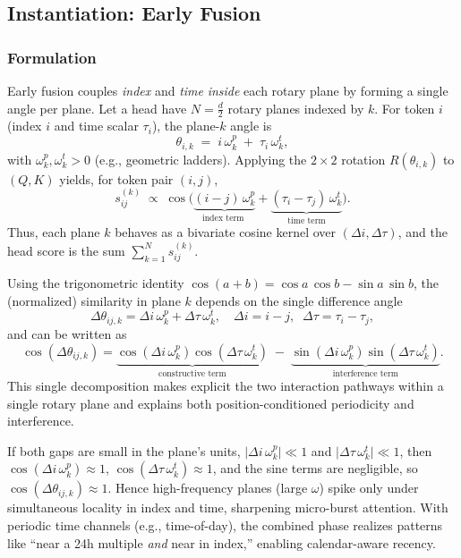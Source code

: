 \documentclass[sigconf]{acmart}
\begin{document}
\subsection{Instantiation: Early Fusion}
\subsubsection{Formulation}
Early fusion couples \emph{index} and \emph{time} \emph{inside} each rotary plane by forming a single angle per plane. 
Let a head have $N=\tfrac{d}{2}$ rotary planes indexed by $k$. For token $i$ (index $i$ and time scalar $\tau_i$), the plane-$k$ angle is
\begin{equation}
\label{eq:ef-theta}
\theta_{i,k}
\;=\;
i\,\omega^p_k \;+\; \tau_i\,\omega^t_k,
\end{equation}
with $\omega^p_k,\omega^t_k>0$ (e.g., geometric ladders). Applying the $2\times2$ rotation $R(\theta_{i,k})$ to $(Q,K)$ yields, for token pair $(i,j)$,
\begin{equation}
\label{eq:ef-score}
s_{ij}^{(k)}
\;\propto\;
\cos\!\Big(\underbrace{(i-j)\,\omega^p_k}_{\text{index term }}
+\underbrace{(\tau_i-\tau_j)\,\omega^t_k}_{\text{time term}}\Big).
\end{equation}
Thus, each plane $k$ behaves as a bivariate cosine kernel over $(\Delta i,\Delta\tau)$, and the head score is the sum $\sum_{k=1}^N s_{ij}^{(k)}$.

Using the trigonometric identity $\cos(a{+}b)=\cos a\,\cos b-\sin a\,\sin b$, the (normalized) similarity in plane $k$ depends on the single difference angle
\[
\Delta\theta_{ij,k}
=\Delta i\,\omega^p_k+\Delta\tau\,\omega^t_k,
\quad
\Delta i=i-j,\;\;\Delta\tau=\tau_i-\tau_j,
\]
and can be written as
\[
\cos(\Delta\theta_{ij,k})
= \underbrace{\cos(\Delta i\,\omega^p_k)\cos(\Delta\tau\,\omega^t_k)}_{\text{constructive term}}
\;-\;
\underbrace{\sin(\Delta i\,\omega^p_k)\sin(\Delta\tau\,\omega^t_k)}_{\text{interference term}}.
\]
This single decomposition makes explicit the two interaction pathways within a single rotary plane and explains both position-conditioned periodicity and interference.

If both gaps are small in the plane’s units, $\lvert \Delta i\,\omega^p_k\rvert\ll 1$ and $\lvert \Delta\tau\,\omega^t_k\rvert\ll 1$, then
$\cos(\Delta i\,\omega^p_k)\!\approx\!1$, $\cos(\Delta\tau\,\omega^t_k)\!\approx\!1$, and the sine terms are negligible, so
$\cos(\Delta\theta_{ij,k})\approx 1$.
Hence high-frequency planes (large $\omega$) spike only under simultaneous locality in index and time, sharpening micro-burst attention. With periodic time channels (e.g., time-of-day), the combined phase realizes patterns like “near a 24h multiple \emph{and} near in index,” enabling calendar-aware recency.
\end{document}
